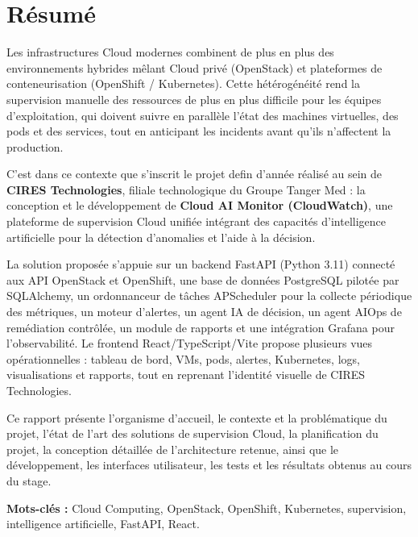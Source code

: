 \documentclass[11pt,a4paper]{report}
\begin{document}
\setcounter{page}{1}

\chapter*{Résumé}

\normalsize
\setlength{\parskip}{0.8em}

Les infrastructures Cloud modernes combinent de plus en plus des environnements
hybrides mêlant Cloud privé (OpenStack) et plateformes de conteneurisation
(OpenShift / Kubernetes). Cette hétérogénéité rend la supervision manuelle des
ressources de plus en plus difficile pour les équipes d'exploitation, qui
doivent suivre en parallèle l'état des machines virtuelles, des pods et des
services, tout en anticipant les incidents avant qu'ils n'affectent la
production.

C'est dans ce contexte que s'inscrit le projet defin d'année réalisé au sein
de \textbf{CIRES Technologies}, filiale technologique du Groupe Tanger Med : la
conception et le développement de \textbf{Cloud AI Monitor (CloudWatch)}, une
plateforme de supervision Cloud unifiée intégrant des capacités
d'intelligence artificielle pour la détection d'anomalies et l'aide à la
décision.

La solution proposée s'appuie sur un backend FastAPI (Python 3.11) connecté
aux API OpenStack et OpenShift, une base de données PostgreSQL pilotée par
SQLAlchemy, un ordonnanceur de tâches APScheduler pour la collecte périodique
des métriques, un moteur d'alertes, un agent IA de décision, un agent AIOps
de remédiation contrôlée, un module de rapports et une intégration Grafana
pour l'observabilité. Le frontend React/TypeScript/Vite propose plusieurs
vues opérationnelles : tableau de bord, VMs, pods, alertes, Kubernetes, logs,
visualisations et rapports, tout en reprenant l'identité visuelle de CIRES
Technologies.

Ce rapport présente l'organisme d'accueil, le contexte et la problématique du
projet, l'état de l'art des solutions de supervision Cloud, la planification
du projet, la conception détaillée de l'architecture retenue, ainsi que le
développement, les interfaces utilisateur, les tests et les résultats obtenus
au cours du stage.

\medskip
\textbf{Mots-clés :} Cloud Computing, OpenStack, OpenShift, Kubernetes,
supervision, intelligence artificielle, FastAPI, React.
\end{document}
